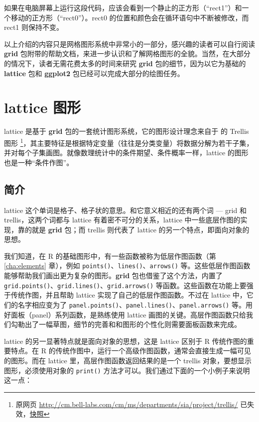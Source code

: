 \documentclass[
  b5paper,
  UTF8,twoside]{book}
\begin{document}
如果在电脑屏幕上运行这段代码，应该会看到一个静止的正方形（``rect1''）和一个移动的正方形（``rect0''）。rect0 的位置和颜色会在循环语句中不断被修改，而 rect1 则保持不变。

以上介绍的内容只是网格图形系统中非常小的一部分，感兴趣的读者可以自行阅读 \textbf{grid} 包附带的帮助文档，来进一步认识和了解网格图形的全貌。当然，在大部分的情况下，读者无需花费太多的时间来研究 \textbf{grid} 包的细节，因为以它为基础的 \textbf{lattice} 包和 \textbf{ggplot2} 包已经可以完成大部分的绘图任务。

\section{lattice 图形}\label{lattice-ux56feux5f62}

lattice \citep{Sarkar08} 是基于 \textbf{grid} 包的一套统计图形系统，它的图形设计理念来自于 \citet{Cleveland93} 的 Trellis 图形 \footnote{原网页 \url{http://cm.bell-labs.com/cm/ms/departments/sia/project/trellis/} 已失效，\href{https://web.archive.org/web/20081019072358/http://cm.bell-labs.com/cm/ms/departments/sia/project/trellis/}{快照}}，其主要特征是根据特定变量（往往是分类变量）将数据分解为若干子集，并对每个子集画图。就像数理统计中的条件期望、条件概率一样，lattice 的图形也是一种``条件作图''。

\subsection{简介}\label{subsec:lattice-intro}

lattice 这个单词是格子、格子状的意思。和它意义相近的还有两个词 --- grid 和 trellis，这两个词都与 lattice 有着密不可分的关系，lattice 中一些底层作图的实现，靠的就是 \textbf{grid} 包；而 trellis 则代表了 lattice 的另一个特点，即面向对象的思想。

我们知道，在 R 的基础图形中，有一些函数被称为低层作图函数（第 \ref{cha:elements} 章），例如 \texttt{points()}、\texttt{lines()}、\texttt{arrows()} 等。这些低层作图函数能够帮助我们画出更为复杂的图形。\textbf{grid} 包也借鉴了这个方法，内置了 \texttt{grid.points()}、\texttt{grid.lines()}、\texttt{grid.arrows()} 等函数。这些函数在功能上要强于传统作图，并且帮助 lattice 实现了自己的低层作图函数。不过在 lattice 中，它们的名字相应变为了 \texttt{panel.points()}、\texttt{panel.lines()}、\texttt{panel.arrows()} 等。用好面板（panel）系列函数，是熟练使用 lattice 画图的关键。高层作图函数只给我们勾勒出了一幅草图，细节的完善和和图形的个性化则需要面板函数来完成。

lattice 的另一显著特点就是面向对象的思想，这是 lattice 区别于 R 传统作图的重要特点。在 R 的传统作图中，运行一个高级作图函数，通常会直接生成一幅可见的图形。而在 lattice 里，高层作图函数返回结果的是一个 trellis 对象，要想显示图形，必须使用对象的 \texttt{print()} 方法才可以。我们通过下面的一个小例子来说明这一点：
\end{document}
